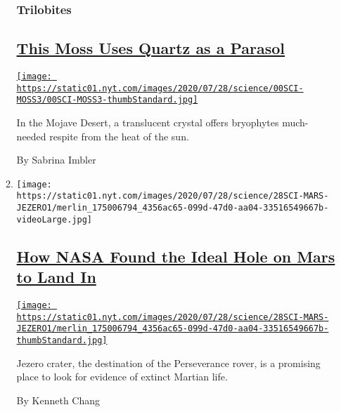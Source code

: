 \begin{enumerate}
\begin{enumerate}
    \hypertarget{trilobites}{%
    \subsubsection{Trilobites}\label{trilobites}}

    \hypertarget{this-moss-uses-quartz-as-a-parasol}{%
    \subsection{\texorpdfstring{\href{/2020/07/29/science/moss-quartz-biology-syntrichia.html}{This
    Moss Uses Quartz as a
    Parasol}}{This Moss Uses Quartz as a Parasol}}\label{this-moss-uses-quartz-as-a-parasol}}

    \href{/2020/07/29/science/moss-quartz-biology-syntrichia.html}{\texttt{[image: https://static01.nyt.com/images/2020/07/28/science/00SCI-MOSS3/00SCI-MOSS3-thumbStandard.jpg]}}

    In the Mojave Desert, a translucent crystal offers bryophytes
    much-needed respite from the heat of the sun.

    By Sabrina Imbler
  \item
    \texttt{[image: https://static01.nyt.com/images/2020/07/28/science/28SCI-MARS-JEZERO1/merlin\_175006794\_4356ac65-099d-47d0-aa04-33516549667b-videoLarge.jpg]}

    \hypertarget{how-nasa-found-the-ideal-hole-on-mars-to-land-in}{%
    \subsection{\texorpdfstring{\href{/2020/07/28/science/nasa-jezero-perseverance.html}{How
    NASA Found the Ideal Hole on Mars to Land
    In}}{How NASA Found the Ideal Hole on Mars to Land In}}\label{how-nasa-found-the-ideal-hole-on-mars-to-land-in}}

    \href{/2020/07/28/science/nasa-jezero-perseverance.html}{\texttt{[image: https://static01.nyt.com/images/2020/07/28/science/28SCI-MARS-JEZERO1/merlin\_175006794\_4356ac65-099d-47d0-aa04-33516549667b-thumbStandard.jpg]}}

    Jezero crater, the destination of the Perseverance rover, is a
    promising place to look for evidence of extinct Martian life.

    By Kenneth Chang
  \end{enumerate}
\end{enumerate}

